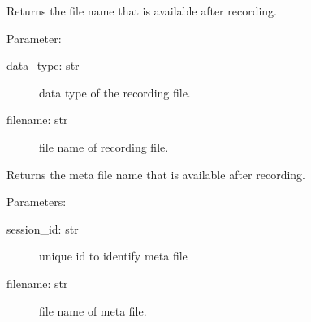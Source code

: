 \documentclass[letterpaper,10pt,english]{sphinxmanual}
\begin{document}

\begin{fulllineitems}
\label{\detokenize{X4 radar:X4_record_playback.on_file_available}}
Returns the file name that is available after recording.

Parameter:
\begin{description}
\item[{data\_type: str}] \leavevmode
data type of the recording file.

\item[{filename: str}] \leavevmode
file name of recording file.

\end{description}

\end{fulllineitems}


\begin{fulllineitems}
\label{\detokenize{X4 radar:X4_record_playback.on_meta_file_available}}
Returns the meta file name that is available after recording.

Parameters:
\begin{description}
\item[{session\_id: str}] \leavevmode
unique id to identify meta file

\item[{filename: str}] \leavevmode
file name of meta file.

\end{description}

\end{fulllineitems}

\end{document}
